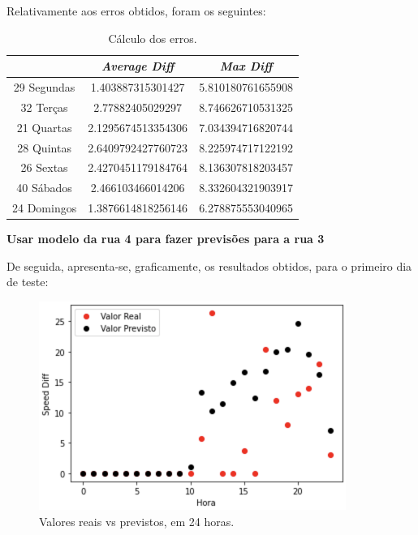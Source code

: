 \documentclass[a4paper, 12pt]{article}
\begin{document}
Relativamente aos erros obtidos, foram os seguintes:

\begin{table}[H]
	\centering
	\begin{tabular}{||c||c|c||}
		\hline\hline
		& \textit{Average Diff} & \textit{Max Diff} \\
		\hline\hline
		29 Segundas & 
1.403887315301427
 & 5.810180761655908\\
		\hline
		32 Terças  &

2.77882405029297 & 8.746626710531325 \\
		\hline
		21 Quartas & 2.1295674513354306

 &7.034394716820744 \\
		\hline
		28 Quintas  & 2.6409792427760723

 &8.225974717122192 \\
		\hline
		26 Sextas & 2.4270451179184764
 &8.136307818203457 \\
		\hline
		40 Sábados  &  2.466103466014206
& 8.332604321903917 \\
		\hline
		24 Domingos & 

1.3876614818256146 & 
6.278875553040965 \\
		\hline\hline
	\end{tabular}
	\label{table:mod4_rua2}
	\caption{Cálculo dos erros.}
\end{table}

\vspace{0.5cm}
\textbf{Usar modelo da rua 4 para fazer previsões para a rua 3}

De seguida, apresenta-se, graficamente, os resultados obtidos, para o primeiro dia de teste:

\begin{figure}[H]
	\centering
	\includegraphics[width=10cm]{resultados/real_prev_mod4_rua3.png}
	\caption{Valores reais vs previstos, em 24 horas.}
\end{figure}
\end{document}
